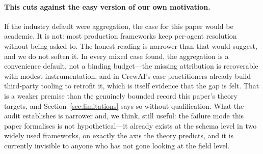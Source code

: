 \paragraph{This cuts against the easy version of our own motivation.} If the
industry default were aggregation, the case for this paper would be
academic. It is not: most production frameworks keep per-agent resolution
without being asked to. The honest reading is narrower than that would
suggest, and we do not soften it. In every mixed case found, the aggregation
is a convenience default, not a binding budget---the missing attribution is
recoverable with modest instrumentation, and in CrewAI's case practitioners
already build third-party tooling to retrofit it, which is itself evidence
that the gap is felt. That is a weaker premise than the genuinely bounded
record this paper's theory targets, and Section~\ref{sec:limitations} says so
without qualification. What the audit establishes is narrower and, we think,
still useful: the failure mode this paper formalises is not hypothetical---it
already exists at the schema level in two widely used frameworks, on exactly
the axis the theory predicts, and it is currently invisible to anyone who has
not gone looking at the field level.

